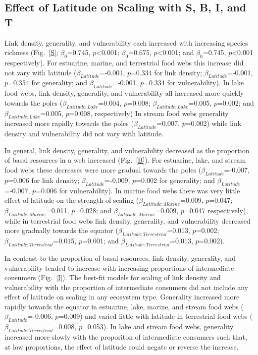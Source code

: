 \documentclass[12pt]{article}
\begin{document}
\subsection*{Effect of Latitude on Scaling with S, B, I, and T}

Link density, generality, and vulnerability each increased with increasing
species richness (Fig.~\ref{S}; $\beta_0$=0.745, $p$\textless0.001; $\beta_0$=0.675,
$p$\textless0.001; and $\beta_0$=0.745, $p$\textless0.001 respectively).  For estuarine,
marine, and terrestrial food webs this increase did not vary with latitude
($\beta_{Latitude}$=-0.001, $p$=0.334 for link density; $\beta_{Latitude}$=-0.001, $p$=0.354 for generality;
and $\beta_{Latitude}$=-0.001, $p$=0.334 for vulnerability). In lake food webs, link density,
generality, and vulnerability all increased more quickly towards the poles
($\beta_{Latitude:Lake}$=0.004, $p$=0.008; $\beta_{Latitude:Lake}$=0.005,
$p$=0.002; and $\beta_{Latitude:Lake}$=0.005, $p$=0.008, respectively) In
stream food webs generality increased more rapidly towards the poles 
($\beta_{Latitude}$=0.007, $p$=0.002) while link density and vulnerability did not vary with latitude.


In general, link density, generality, and vulnerability decreased as the
proportion of basal resources in a web increased (Fig.~\ref{B}). For
estuarine, lake, and stream food webs these decreases were more gradual towards the
poles ($\beta_{Latitude}$=-0.007, $p$=0.006 for link density;
$\beta_{Latitude}$=-0.009, $p$=0.002 for generality; and
$\beta_{Latitude}$=-0.007, $p$=0.006 for vulnerability).
In marine food webs there was very little effect of latitude on
the strength of scaling ($\beta_{Latitude:Marine}$=0.009, $p$=0.047; 
$\beta_{Latitude:Marine}$=0.011, $p$=0.028; 
and $\beta_{Latitude:Marine}$=0.009, $p$=0.047 respectively),
while in terrestrial food webs link density, generality, and vulnerability
decreased more gradually towards the 
equator ($\beta_{Latitude:Terrestrial}$=0.013, $p$=0.002; 
$\beta_{Latitude:Terrestrial}$=0.015, $p$=0.001; 
and $\beta_{Latitude:Terrestrial}$=0.013, $p$=0.002).


In contrast to the proportion of basal resources, link density, generality,
and vulnerability tended to increase with increasing proportions of
intermediate consumers (Fig.~\ref{I}). The best-fit models for scaling of link
density and vulnerability with the proportion of intermediate consumers did
not include any effect of latitude on scaling in any ecosystem type. Generality
increased more rapidly towards the equator in estuarine, lake, marine, and
stream food webs ($\beta_{Latitude}$=-0.006, $p$=0.009) and varied little with
latitude in terrestrial food webs ($\beta_{Latitude:Terrestrial}$=0.008,
$p$=0.053). In lake and stream food webs, generality increased more slowly
with the proporiton of intermediate consumers such that, at low proportions,
the effect of latitude could negate or reverse the increase.
\end{document}

